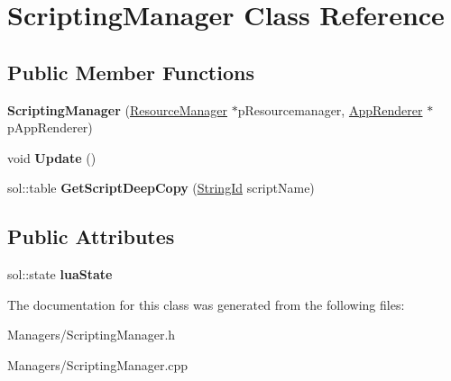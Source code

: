 \hypertarget{classScriptingManager}{}\section{Scripting\+Manager Class Reference}
\label{classScriptingManager}
\subsection*{Public Member Functions}
\begin{DoxyCompactItemize}
\item 
\mbox{\label{classScriptingManager_aa57538af16a75f030503604cca413322}} 
{\bfseries Scripting\+Manager} (\hyperlink{classResourceManager}{Resource\+Manager} $\ast$p\+Resourcemanager, \hyperlink{classAppRenderer}{App\+Renderer} $\ast$p\+App\+Renderer)
\item 
\mbox{\label{classScriptingManager_a992e8bd3e6d21e793abceb684d4717ae}} 
void {\bfseries Update} ()
\item 
\mbox{\label{classScriptingManager_a11b9b6914dd4f5c2daa8ece918e0131c}} 
sol\+::table {\bfseries Get\+Script\+Deep\+Copy} (\hyperlink{classStringId}{String\+Id} script\+Name)
\end{DoxyCompactItemize}
\subsection*{Public Attributes}
\begin{DoxyCompactItemize}
\item 
\mbox{\label{classScriptingManager_a168106b9f3693d9237b4445b177ba477}} 
sol\+::state {\bfseries lua\+State}
\end{DoxyCompactItemize}


The documentation for this class was generated from the following files\+:\begin{DoxyCompactItemize}
\item 
Managers/Scripting\+Manager.\+h\item 
Managers/Scripting\+Manager.\+cpp\end{DoxyCompactItemize}
